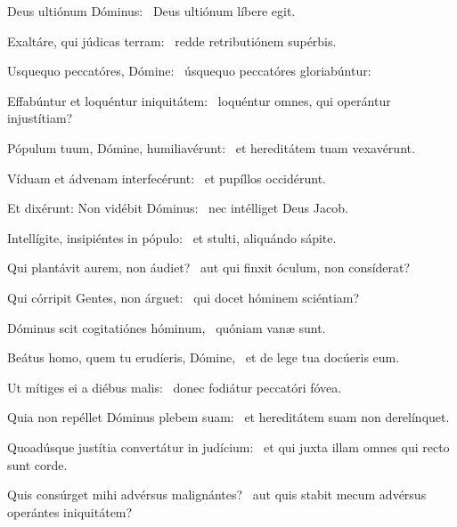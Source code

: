 \item Deus ultiónum Dóminus:~\psstar{} Deus ultiónum líbere egit.

\item Exaltáre, qui júdicas terram:~\psstar{} redde retributiónem supérbis.

\item Usquequo peccatóres, Dómine:~\psstar{} úsquequo peccatóres gloriabúntur:

\item Effabúntur et loquéntur iniquitátem:~\psstar{} loquéntur omnes, qui operántur injustítiam?

\item Pópulum tuum, Dómine, humiliavérunt:~\psstar{} et hereditátem tuam vexavérunt.

\item Víduam et ádvenam interfecérunt:~\psstar{} et pupíllos occidérunt.

\item Et dixérunt: Non vidébit Dóminus:~\psstar{} nec intélliget Deus Jacob.

\item Intellígite, insipiéntes in pópulo:~\psstar{} et stulti, aliquándo sápite.

\item Qui plantávit aurem, non áudiet?~\psstar{} aut qui finxit óculum, non consíderat?

\item Qui córripit Gentes, non árguet:~\psstar{} qui docet hóminem sciéntiam?

\item Dóminus scit cogitatiónes hóminum,~\psstar{} quóniam vanæ sunt.

\item Beátus homo, quem tu erudíeris, Dómine,~\psstar{} et de lege tua docúeris eum.

\item Ut mítiges ei a diébus malis:~\psstar{} donec fodiátur peccatóri fóvea.

\item Quia non repéllet Dóminus plebem suam:~\psstar{} et hereditátem suam non derelínquet.

\item Quoadúsque justítia convertátur in judícium:~\psstar{} et qui juxta illam omnes qui recto sunt corde.

\item Quis consúrget mihi advérsus malignántes?~\psstar{} aut quis stabit mecum advérsus operántes iniquitátem?

